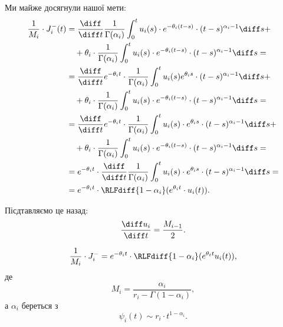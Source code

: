 Ми майже досягнули нашої мети:
\begin{equation}
    \begin{aligned}
        \frac{1}{M_i} \cdot J_i^-(t)
        &= \frac{\diff}{\diff t} \frac{1}{\Gamma(\alpha_i)} \int_0^t u_i(s) \cdot e^{-\theta_i (t - s)} \cdot (t - s)^{\alpha_i - 1} \diff s + \\
        &\quad + \theta_i \cdot \frac{1}{\Gamma(\alpha_i)} \int_0^t u_i(s) \cdot e^{-\theta_i (t - s)} \cdot (t - s)^{\alpha_i - 1} \diff s = \\
        &= \frac{\diff}{\diff t} e^{-\theta_i t} \cdot \frac{1}{\Gamma(\alpha_i)} \int_0^t u_i(s) e^{\theta_i s} \cdot (t - s)^{\alpha_i - 1} \diff s + \\
        &\quad + \theta_i \cdot \frac{1}{\Gamma(\alpha_i)} \int_0^t u_i(s) \cdot e^{-\theta_i (t - s)} \cdot (t - s)^{\alpha_i - 1} \diff s = \\
        &= \frac{\diff}{\diff t} e^{-\theta_i t} \cdot \frac{1}{\Gamma(\alpha_i)} \int_0^t u_i(s) \cdot e^{\theta_i s} \cdot (t - s)^{\alpha_i - 1} \diff s + \\
        &\quad + \theta_i \cdot \frac{1}{\Gamma(\alpha_i)} \int_0^t u_i(s) \cdot e^{-\theta_i (t - s)} \cdot (t - s)^{\alpha_i - 1} \diff s = \\
        &= e^{-\theta_i t} \cdot \frac{\diff}{\diff t} \frac{1}{\Gamma(\alpha_i)} \int_0^t u_i(s) \cdot e^{\theta_i s} \cdot (t - s)^{\alpha_i - 1} \diff s = \\
        &= e^{-\theta_i t} \cdot \RLFdiff{1 - \alpha_i} (e^{\theta_i t} \cdot u_i(t)).
    \end{aligned}
\end{equation}

Пісдтавляємо це назад:
\begin{equation}
    \frac{\diff u_i}{\diff t} = \frac{M_{i - 1}}{2}.    
\end{equation}

\begin{equation}
    \frac{1}{M_i} \cdot J_i^- = e^{-\theta_i t} \cdot \RLFdiff{1 - \alpha_i}(e^{\theta_t t} u_i(t)),
\end{equation}
де
\begin{equation}
    M_i = \frac{\alpha_i}{r_i - \Gamma(1 - \alpha_i)},
\end{equation}
а $\alpha_i$ береться з 
\begin{equation}
    \psi_i(t) \sim r_i \cdot t^{1 - \alpha_i}.
\end{equation}


